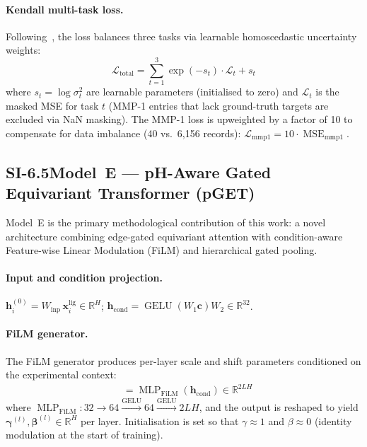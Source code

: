 \documentclass[11pt]{article}
\begin{document}
\paragraph{Kendall multi-task loss.}
Following~\cite{kendall2018multi}, the loss balances three tasks via learnable
homoscedastic uncertainty weights:
\begin{equation}
  \mathcal{L}_{\mathrm{total}} = \sum_{t=1}^{3}
  \exp(-s_t) \cdot \mathcal{L}_t + s_t
  \label{eq:kendall}
\end{equation}
where $s_t = \log \sigma_t^2$ are learnable parameters (initialised to zero)
and $\mathcal{L}_t$ is the masked MSE for task $t$
(MMP-1 entries that lack ground-truth targets are excluded via NaN masking).
The MMP-1 loss is upweighted by a factor of 10 to compensate for data
imbalance (40 vs.\ 6{,}156 records):
$\mathcal{L}_{\mathrm{mmp1}} = 10 \cdot \operatorname{MSE}_{\mathrm{mmp1}}$.

\subsection*{SI-6.5\quad Model~E --- pH-Aware Gated Equivariant Transformer (pGET)}
\label{si:model_e}

Model~E is the primary methodological contribution of this work:
a novel architecture combining edge-gated equivariant attention with
condition-aware Feature-wise Linear Modulation (FiLM) and hierarchical
gated pooling.

\paragraph{Input and condition projection.}
$\mathbf{h}_i^{(0)} = W_{\mathrm{inp}}\, \mathbf{x}_i^{\mathrm{lig}}
\in \mathbb{R}^{H}$;
$\mathbf{h}_{\mathrm{cond}} = \operatorname{GELU}(W_1 \mathbf{c}) W_2
\in \mathbb{R}^{32}$.

\paragraph{FiLM generator.}
The FiLM generator produces per-layer scale and shift parameters
conditioned on the experimental context:
\begin{align}
  [\boldsymbol{\gamma}^{(1)}, \ldots, \boldsymbol{\gamma}^{(L)},\,
   \boldsymbol{\beta}^{(1)}, \ldots, \boldsymbol{\beta}^{(L)}]
  &= \operatorname{MLP}_{\mathrm{FiLM}}(\mathbf{h}_{\mathrm{cond}})
  \in \mathbb{R}^{2LH} \label{eq:film_gen}
\end{align}
where $\operatorname{MLP}_{\mathrm{FiLM}}:
32 \to 64 \xrightarrow{\mathrm{GELU}} 64 \xrightarrow{\mathrm{GELU}} 2LH$,
and the output is reshaped to yield
$\boldsymbol{\gamma}^{(l)}, \boldsymbol{\beta}^{(l)} \in \mathbb{R}^{H}$
per layer.
Initialisation is set so that $\gamma \approx 1$ and $\beta \approx 0$
(identity modulation at the start of training).
\end{document}
